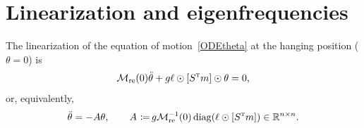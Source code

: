 \documentclass[12pt]{article}
\newcommand{\T}{\textsc{t}}
\newcommand{\cM}{\mathcal{M}}
\theoremstyle{sfdefinition}%
\theoremstyle{sfdefinition}
\newcommand{\mR}{\mathbb{R}}
\DeclareMathOperator{\diag}{diag}
\newcommand{\ep}{\odot}
\DeclareMathOperator{\coloneq}{\,\raisebox{.08ex}{\ensuremath{:}}\!\!=}
\begin{document}

\section{Linearization and eigenfrequencies}\label{sec5}
The linearization of the equation of motion~\eqref{ODEtheta} at the
hanging position ($\theta=0$) is
\begin{equation}\label{eq:linz}
  \cM_{\rm re}(0)\ddot\theta+g\ell\ep[S^{\T}m]\ep\theta=0, 
\end{equation}
or, equivalently,
\begin{equation}\label{eq:lin}
  \ddot\theta = -A\theta,
  \qquad
  A \coloneq  g\cM_{\rm re}^{-1}(0)\diag(\ell\ep[S^{\T}m])
  \in\mR^{n\times n}.
\end{equation}
\end{document}
